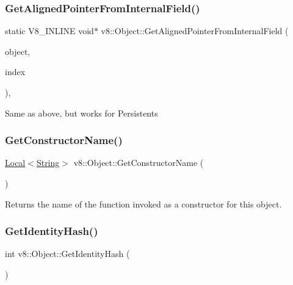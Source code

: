 \subsubsection{\texorpdfstring{Get\+Aligned\+Pointer\+From\+Internal\+Field()}{GetAlignedPointerFromInternalField()}\hspace{0.1cm}{\footnotesize\ttfamily [2/2]}}
{\footnotesize\ttfamily static V8\+\_\+\+I\+N\+L\+I\+NE void$\ast$ v8\+::\+Object\+::\+Get\+Aligned\+Pointer\+From\+Internal\+Field (\begin{DoxyParamCaption}\item[{const \mbox{\hyperlink{classv8_1_1PersistentBase}{Persistent\+Base}}$<$ \mbox{\hyperlink{classv8_1_1Object}{Object}} $>$ \&}]{object,  }\item[{int}]{index }\end{DoxyParamCaption})\hspace{0.3cm}{\ttfamily [inline]}, {\ttfamily [static]}}

Same as above, but works for Persistents \mbox{\label{classv8_1_1Object_a7bbe987794658f20a3ec1b68326305e6}} 
\subsubsection{\texorpdfstring{Get\+Constructor\+Name()}{GetConstructorName()}}
{\footnotesize\ttfamily \mbox{\hyperlink{classv8_1_1Local}{Local}}$<$\mbox{\hyperlink{classv8_1_1String}{String}}$>$ v8\+::\+Object\+::\+Get\+Constructor\+Name (\begin{DoxyParamCaption}{ }\end{DoxyParamCaption})}

Returns the name of the function invoked as a constructor for this object. \mbox{\label{classv8_1_1Object_ac1ece41e81a499920ec3a2a3471653bc}} 
\subsubsection{\texorpdfstring{Get\+Identity\+Hash()}{GetIdentityHash()}}
{\footnotesize\ttfamily int v8\+::\+Object\+::\+Get\+Identity\+Hash (\begin{DoxyParamCaption}{ }\end{DoxyParamCaption})}

